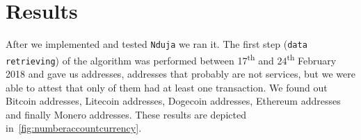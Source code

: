 \newcommand{\accountGitlab}{2}

\newcommand{\accountBitbucket}{1}

\newcommand{\facebookRelatedAccounts}{12}
\newcommand{\linkedinRelatedAccount}{30}



\section{Results} \label{results}

After we implemented and tested \texttt{Nduja} we ran it. The first step
(\texttt{data retrieving}) of the algorithm  was performed between
17\textsuperscript{th} and 24\textsuperscript{th} February 2018 and gave us
\startingNumberAllWallets{} addresses, \startingNumberWalletsNotService{}
addresses that probably are not services, but we were able to attest that only
\startingNumberWalletsAtLeastOneTransaction{} of them had at least one
transaction. We found out \startingBTC{} Bitcoin addresses, \startingLTC{}
Litecoin addresses, \startingDOGE{} Dogecoin addresses, \startingETH{} Ethereum
addresses and finally \startingXMR{} Monero addresses. These results are
depicted in~\autoref{fig:numberaccountcurrency}.



